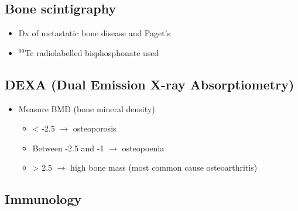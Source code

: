 \documentclass[
  12pt,
]{memoir}
\providecommand{\tightlist}{%
  \setlength{\itemsep}{0pt}\setlength{\parskip}{0pt}}
\begin{document}
\hypertarget{bone-scintigraphy}{%
\subsection{Bone scintigraphy}\label{bone-scintigraphy}}

\begin{itemize}
\tightlist
\item
  Dx of metastatic bone disease and Paget's
\item
  \(^{99}\)Tc radiolabelled bisphosphonate used
\end{itemize}

\hypertarget{dexa-dual-emission-x-ray-absorptiometry}{%
\subsection{DEXA (Dual Emission X-ray
Absorptiometry)}\label{dexa-dual-emission-x-ray-absorptiometry}}

\begin{itemize}
\tightlist
\item
  Measure BMD (bone mineral density)

  \begin{itemize}
  \tightlist
  \item
    \textless{} -2.5 \(\rightarrow\) osteoporosis
  \item
    Between -2.5 and -1 \(\rightarrow\) osteopoenia
  \item
    \textgreater{} 2.5 \(\rightarrow\) high bone mass (most common cause
    osteoarthritis)
  \end{itemize}
\end{itemize}

\hypertarget{immunology}{%
\subsection{Immunology}\label{immunology}}
\end{document}
